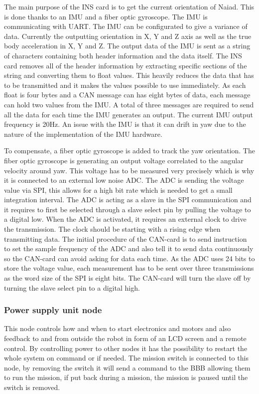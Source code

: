 \noindent The main purpose of the INS card is to get the current orientation of Naiad. This is done thanks to an IMU and a fiber optic gyroscope. The IMU is communicating with UART. The IMU can be configurated to give a variance of data. Currently the outputting orientation in X, Y and Z axis as well as the true body acceleration in X, Y and Z. The output data of the IMU is sent as a string of characters containing both header information and the data itself. The INS card removes all of the header information by extracting specific sections of the string and converting them to float values. This heavily reduces the data that has to be transmitted and it makes the values possible to use immediately. As each float is four bytes and a CAN message can has eight bytes of data, each message can hold two values from the IMU. A total of three messages are required to send all the data for each time the IMU generates an output. The current IMU output frequency is 20Hz. An issue with the IMU is that it can drift in yaw due to the nature of the implementation of the IMU hardware. 

To compensate, a fiber optic gyroscope is added to track the yaw orientation. The fiber optic gyroscope is generating an output voltage correlated to the angular velocity around yaw. This voltage has to be measured very precisely which is why it is connected to an external low noise ADC. The ADC is sending the voltage value via SPI, this allows for a high bit rate which is needed to get a small integration interval. The ADC is acting as a slave in the SPI communication and it requires to first be selected through a slave select pin by pulling the voltage to a digital low. When the ADC is activated, it requires an external clock to drive the transmission. The clock should be starting with a rising edge when transmitting data. The initial procedure of the CAN-card is to send instruction to set the sample frequency of the ADC and also tell it to send data continuously so the CAN-card can avoid asking for data each time. As the ADC uses 24 bits to store the voltage value, each measurement has to be sent over three transmissions as the word size of the SPI is eight bits. The CAN-card will turn the slave off by turning the slave select pin to a digital high. 

\subsubsection{Power supply unit node}
\noindent This node controls how and when to start electronics and motors and also feedback to and from outside the robot in form of an LCD screen and a remote control. By controlling power to other nodes it has the possibility to restart the whole system on command or if needed.
The mission switch is connected to this node, by removing the switch it will send a command to the BBB allowing them to run the mission, if put back during a mission, the mission is paused until the switch is removed.
